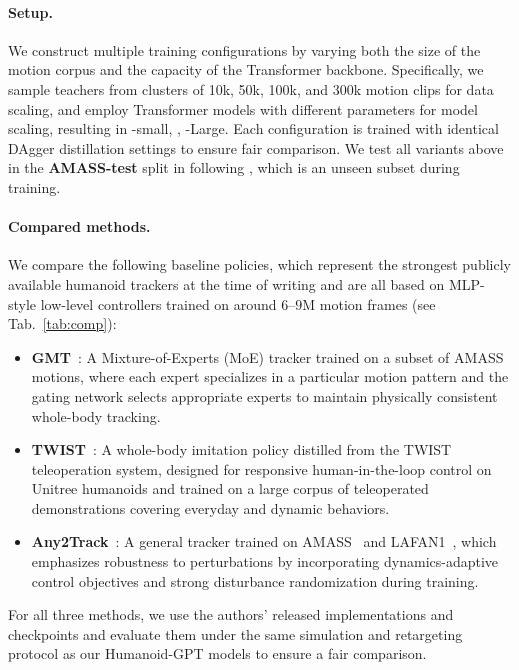 \paragraph{Setup.}
We construct multiple training configurations by varying both the size of the motion corpus and the capacity of the Transformer backbone. 
Specifically, we sample teachers from clusters of 10k, 50k, 100k, and 300k motion clips for data scaling, and employ Transformer models with different parameters for model scaling, resulting in \methodname-small, \methodname, \methodname-Large. Each configuration is trained with identical DAgger distillation settings to ensure fair comparison. We test all variants above in the \textbf{AMASS-test} split in \citep{amass19} following \citep{phc23}, which is an unseen subset during training.

\paragraph{Compared methods.}
We compare the following baseline policies, which represent the strongest publicly available humanoid trackers at the time of writing and are all based on MLP-style low-level controllers trained on around $6$--$9$M motion frames (see Tab.~\ref{tab:comp}):
\begin{itemize}[leftmargin=1.0em]
    \item \textbf{GMT}~\cite{gmt25}: A Mixture-of-Experts (MoE) tracker trained on a subset of AMASS~\cite{amass19} motions, where each expert specializes in a particular motion pattern and the gating network selects appropriate experts to maintain physically consistent whole-body tracking.
    \item \textbf{TWIST}~\cite{twist25}: A whole-body imitation policy distilled from the TWIST teleoperation system, designed for responsive human-in-the-loop control on Unitree humanoids and trained on a large corpus of teleoperated demonstrations covering everyday and dynamic behaviors.
    \item \textbf{Any2Track}~\cite{any2track25}: A general tracker trained on AMASS~\cite{amass19} and LAFAN1~\cite{lafan20}, which emphasizes robustness to perturbations by incorporating dynamics-adaptive control objectives and strong disturbance randomization during training.
\end{itemize}
For all three methods, we use the authors' released implementations and checkpoints and evaluate them under the same simulation and retargeting protocol as our Humanoid-GPT models to ensure a fair comparison.


